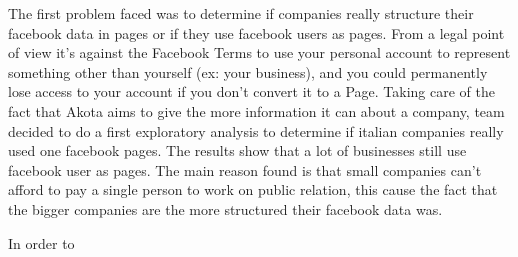 The first problem faced was to determine if companies really structure their facebook data in pages or if they use facebook users as pages. 
From a legal point of view it's against the Facebook Terms to use your personal account to represent something other than yourself (ex: your business), and you could permanently lose access to your account if you don't convert it to a Page. Taking care of the fact that Akota aims to give the more information it can about a company, team decided to do a first exploratory analysis to determine if italian companies really used one facebook pages. The results show that a lot of businesses still use facebook user as pages. The main reason found is that small companies can't afford to pay a single person to work on public relation, this cause the fact that the bigger companies are the more structured their facebook data was.
\cite{facebooksum}

In order to 

%
%




